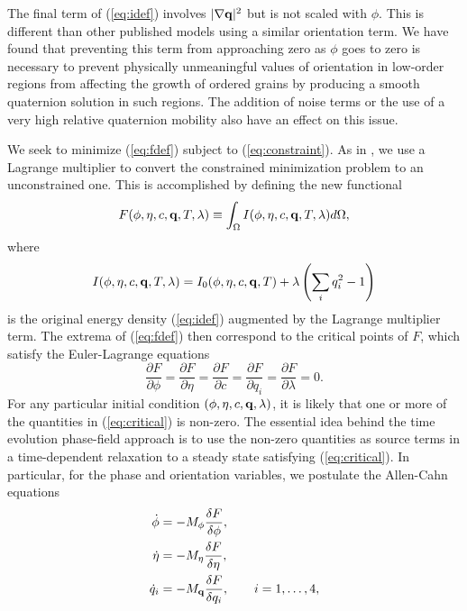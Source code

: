 The final term of (\ref{eq:idef}) involves $|\nabla {\bf q} |^2$ but
is not scaled with $\phi$.  This is different than other published
models using a similar orientation term.  We have found that
preventing this term from approaching zero as $\phi$ goes to zero is
necessary to prevent physically unmeaningful values of orientation in
low-order regions from affecting the growth of ordered grains by
producing a smooth quaternion solution in such regions.  The addition
of noise terms or the use of a very high relative quaternion mobility
also have an effect on this issue.

We seek to minimize (\ref{eq:fdef}) subject to (\ref{eq:constraint}).
As in \cite{0295-5075-71-1-131}, we use a Lagrange multiplier to
convert the constrained minimization problem to an unconstrained one.
This is accomplished by defining the new functional
%
\begin{equation}
  F(\phi,\eta,c,{\bf q},T,\lambda) \equiv
    \int_{\Omega} I(\phi,\eta,c,{\bf q},T,\lambda) d\Omega,
\label{eq:ftildedef}
\end{equation}
%
where
%
\begin{equation}
  I(\phi,\eta,c,{\bf q},T,\lambda) = I_0(\phi,\eta,c,{\bf q},T) +
    \lambda \left ( \sum_i q_i^2 - 1 \right )
\label{eq:integrand}
\end{equation}
%
is the original energy density (\ref{eq:idef}) augmented by the
Lagrange multiplier term.  The extrema of (\ref{eq:fdef}) then
correspond to the critical points of $F$, which satisfy the
Euler-Lagrange equations
%
\begin{equation}
  \frac{\partial F}{\partial \phi} =
  \frac{\partial F}{\partial \eta} =
  \frac{\partial F}{\partial c} =
  \frac{\partial F}{\partial q_i} =
  \frac{\partial F}{\partial \lambda} =
  0.
\label{eq:critical}
\end{equation}
%
For any particular initial condition $(\phi,\eta,c,{\bf q},\lambda)$,
it is likely that one or more of the quantities in (\ref{eq:critical})
is non-zero.  The essential idea behind the time evolution phase-field
approach is to use the non-zero quantities as source terms in a
time-dependent relaxation to a steady state satisfying
(\ref{eq:critical}).  In particular, for the phase and orientation
variables, we postulate the Allen-Cahn equations \cite{AllenCahn79}
%
\begin{align}
  \dot{\phi} & = - M_{\phi} \frac{\delta
    F}{\delta \phi} ,
\label{eq:phirelax} \\
  \dot{\eta} & = - M_{\eta} \frac{\delta
    F}{\delta \eta} ,
\label{eq:etarelax} \\
  \dot{q}_i & = - M_{\bf q} \frac{\delta
    F}{\delta q_i} , \hspace{2em} i=1,\ldots,4,
\label{eq:qrelax}
\end{align}
